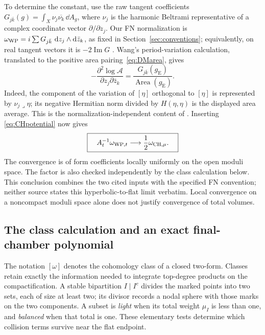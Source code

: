 To determine the constant, use the raw tangent coefficients
$G_{j\bar k}(g)=\int_X\nu_j\overline{\nu_k}\,\dd A_g$, where
$\nu_j$ is the harmonic Beltrami representative of a complex coordinate
vector $\partial/\partial z_j$. Our FN normalization is
$\omega_{\mathrm{WP}}=i\sum G_{j\bar k}\,\mathop{}\!\mathrm d z_j\wedge\mathop{}\!\mathrm d\bar z_k$,
as fixed in Section~\ref{sec:conventions}; equivalently, on real
tangent vectors it is $-2\operatorname{Im}G$
\cite[Section 6.1, equation (38)]{KawazumiWP}.
Wang's period-variation calculation, translated to the positive area
pairing~\eqref{eq:DMarea}, gives
\[
 -\frac{\partial^2\log\mathcal A}{\partial z_j\partial\bar z_k}
  =\frac{G_{j\bar k}(g_{\mathrm E})}
         {\operatorname{Area}(g_{\mathrm E})}.
\]
Indeed, the component of the variation of $[\eta]$ orthogonal to
$[\eta]$ is represented by $\nu_j\mathbin{\lrcorner}\eta$; its
negative Hermitian norm divided by $H(\eta,\eta)$ is the displayed
area average. This is the normalization-independent content of
\cite[Theorem 1.2.1 and Section 4.4]{WangFlatWP}. Inserting
\eqref{eq:CHpotential} now gives
\begin{equation}
 \boxed{\quad A_t^{-1}\omega_{\mathrm{WP},t}
       \longrightarrow\frac12\omega_{\mathrm{CH},\mu}.\quad}
 \label{eq:localWPCHlimit}
\end{equation}
The convergence is of form coefficients locally uniformly on the
open moduli space. The factor is also checked independently by the
class calculation below. This conclusion combines the two cited
inputs with the specified FN convention; neither source states this
hyperbolic-to-flat limit verbatim. Local convergence on a noncompact
moduli space alone does not justify convergence of total volumes.

\subsection{The class calculation and an exact final-chamber polynomial}

The notation $[\omega]$ denotes the cohomology class of a closed
two-form. Classes retain exactly the information needed to
integrate top-degree products on the compactification. A stable
bipartition $I\mid I^c$ divides the marked points into two sets,
each of size at least two; its divisor records a nodal sphere
with those marks on the two components. A subset is \emph{light}
when its total weight $\mu_I$ is less than one, and \emph{balanced}
when that total is one. These elementary tests determine which
collision terms survive near the flat endpoint.

